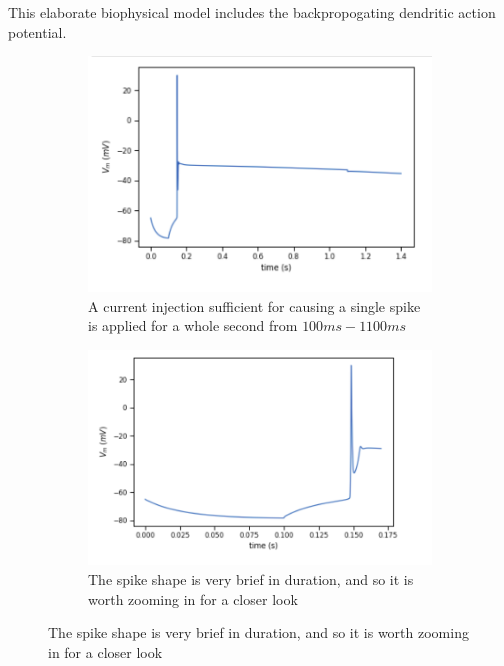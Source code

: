 This elaborate biophysical model includes the backpropogating dendritic action potential.
\url{}



\begin{figure}
\begin{center}


\centering
\begin{subfigure}{.2}
  \centering
    \includegraphics[scale=0.5]{figures/correct_active_l5pc.png}
    \caption{A current injection sufficient for causing a single spike is applied for a whole second from $100ms-1100ms$}
  \label{fig:sub1}
\end{subfigure}

\centering
\begin{subfigure}{.2}
  \centering
    \includegraphics[scale=0.5]{figures/spike_shape.png}
    \caption{The spike shape is very brief in duration, and so it is worth zooming in for a closer look}
  \label{fig:sub1}
\end{subfigure}



\end{center}
\end{figure}
